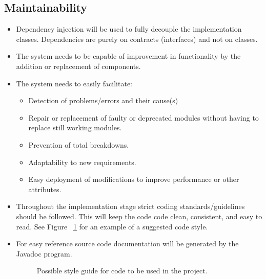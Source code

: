 \documentclass[a4paper,12pt,titlepage]{article}
\begin{document}
\subsection{Maintainability}
\begin{itemize}
	\item Dependency injection will be used to fully decouple the implementation classes. Dependencies are purely on contracts (interfaces) and not on classes.
	\item The system needs to be capable of improvement in functionality by the addition or replacement of components.
	\item The system needs to easily facilitate:
	\begin{itemize}
		\item Detection of problems/errors and their cause(s)
		\item Repair or replacement of faulty or deprecated modules without having to replace still working modules.
		\item Prevention of total breakdowns.
		\item Adaptability to new requirements.
		\item Easy deployment of modifications to improve performance or other attributes.
	\end{itemize}
	\item Throughout the implementation stage strict coding standards/guidelines should be followed. This will keep the code code clean, consistent, and easy to read. See Figure ~\ref{fig:posibCodeStyle} for an example of a suggested code style.
	\item For easy reference source code documentation will be generated by the Javadoc program.
	\begin{figure}[H]
		\fbox{}
		\caption{Possible style guide for code to be used in the project.}
		\label{fig:posibCodeStyle}
	\end{figure}
\end{itemize}
\end{document}
